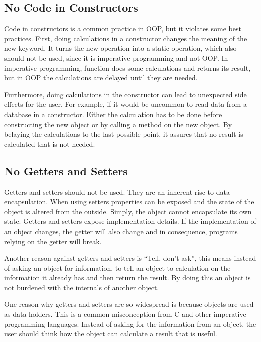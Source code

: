 \subsection{No Code in Constructors}\label{subsec:no-code-in-constructors}
Code in constructors is a common practice in \gls{OOP}, but it violates some best practices.
First, doing calculations in a constructor changes the meaning of the new keyword.
It turns the new operation into a static operation, which also should not be used, since it is imperative programming and not \gls{OOP}.
In imperative programming, function does some calculations and returns its result, but in \gls{OOP} the calculations are delayed until they are needed.

Furthermore, doing calculations in the constructor can lead to unexpected side effects for the user.
For example, if it would be uncommon to read data from a database in a constructor.
Either the calculation has to be done before constructing the new object or by calling a method on the new object.
By belaying the calculations to the last possible point, it assures that no result is calculated that is not needed.

\subsection{No Getters and Setters}\label{subsec:no-getters-and-setters}
Getters and setters should not be used.
They are an inherent risc to data encapsulation.
When using setters properties can be exposed and the state of the object is altered from the outside.
Simply, the object cannot encapsulate its own state.\cite{encapsulation}
Getters and setters expose implementation details.
If the implementation of an object changes, the getter will also change and in consequence, programs relying on the getter will break.

Another reason against getters and setters is ``Tell, don't ask'', this means instead of asking an object for information, to tell an object to calculation on the information it already has and then return the result.
By doing this an object is not burdened with the internals of another object.\cite{tell-dont-ask}

One reason why getters and setters are so widespread is because objects are used as data holders.
This is a common misconception from C and other imperative programming languages.
Instead of asking for the information from an object, the user should think how the object can calculate a result that is useful.

